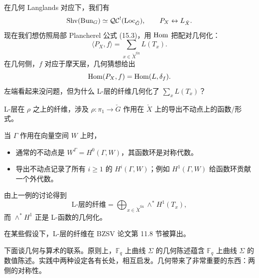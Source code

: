 在几何 Langlands 对应下，我们有
\[
  \operatorname{Shv}(\operatorname{Bun}_G)\simeq\mathcal{QC}^!(\operatorname{Loc}_{\check G}),\qquad P_X\leftrightarrow L_{\check X}.
\]
现在我们想仿照局部 Plancherel 公式 (15.3)，用 $\operatorname{Hom}$ 把配对几何化：
\[
  \langle P_X,f\rangle=\sum_{x\in\check X^{\mathrm{fix}}}L(T_x).
\]
在几何侧，$f$ 对应于摩天层，几何猜想给出
\[
  \operatorname{Hom}(P_X,f)=\operatorname{Hom}(L,\delta_f).
\]
左端看起来没问题，但为什么 L-层的纤维几何化了 $\sum_x L(T_x)$？

L-层在 $\rho$ 之上的纤维，涉及 $\rho:\pi_1\to\check G$ 作用在 $\check X$ 上的导出不动点上的函数/形式。

\begin{exmp}
当 $\Gamma$ 作用在向量空间 $W$ 上时，
\begin{itemize}[leftmargin=1.6em]
  \item 通常的不动点是 $W^\Gamma=H^0(\Gamma,W)$，其函数环是对称代数。
  \item 导出不动点记录了所有 $i\ge1$ 的 $H^i(\Gamma,W)$；例如 $H^1(\Gamma,W)$ 给函数环贡献一个外代数。
\end{itemize}
\end{exmp}

由上一例的讨论得到
\[
  \text{L-层的纤维}=\bigoplus_{x\in\check X^{\mathrm{fix}}}\wedge^*H^1(T_x),
\]
而 $\wedge^*H^1$ 正是 L-函数的几何化。

\begin{rem}
在某些假设下，L-层的纤维在 BZSV 论文第 11.8 节被算出。
\end{rem}

下面谈几何与算术的联系。原则上，$\mathbb F_q$ 上曲线 $\Sigma$ 的几何陈述蕴含 $\mathbb F_q$ 上曲线 $\Sigma$ 的数值陈述。实践中两种设定各有长处，相互启发。几何带来了非常重要的东西：两侧的对称性。
